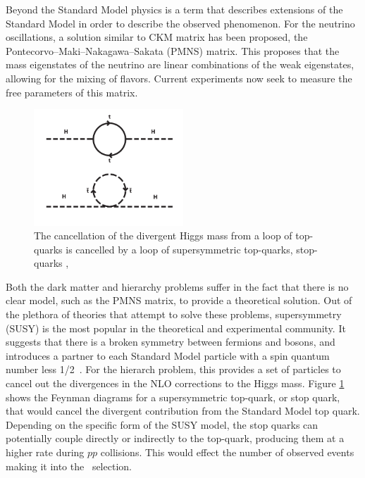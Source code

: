 \par Beyond the Standard Model physics is a term that describes
extensions of the Standard Model in order to describe the observed
phenomenon.  For the neutrino oscillations, a solution similar to CKM
matrix has been proposed, the Pontecorvo–Maki–Nakagawa–Sakata (PMNS)
matrix.  This proposes that the mass eigenstates of the neutrino are
linear combinations of the weak eigenstates, allowing for the mixing
of flavors.  Current experiments now seek to measure the free
parameters of this matrix.  

\begin{figure}[h]
   \centering
  \includegraphics[width=0.5\textwidth]{Figures/Basic_Diagrams/hierarchy_problem_susy_solution.png}
  \caption{The cancellation of the divergent Higgs mass from a loop of
  top-quarks is cancelled by a loop of supersymmetric top-quarks,
  stop-quarks \cite{ex:Hierarchy_image},} \label{fig:hierarchy_problem}
\end{figure}

\par Both the dark matter and hierarchy problems suffer in the fact
that there is no clear model, such as the PMNS matrix, to provide a
theoretical solution.  Out of the plethora of theories that attempt to
solve these problems, supersymmetry (SUSY) is the most popular in the
theoretical and experimental community.  It suggests that there is a
broken symmetry between fermions and bosons, and introduces a partner
to each Standard Model particle with a spin quantum number less
1/2~\cite{Martin_SUSY_primer}.  For the hierarch problem, this
provides a set of particles to cancel out the divergences in the NLO
corrections to the Higgs mass.  Figure \ref{fig:hierarchy_problem}
shows the Feynman diagrams for a supersymmetric top-quark, or stop
quark, that would cancel the divergent contribution from the Standard
Model top quark.  Depending on the specific form of the SUSY model,
the stop quarks can potentially couple directly or indirectly to the
top-quark, producing them at a higher rate during $pp$ collisions.
This would effect the number of observed events making it into the
\ttH~selection.  

